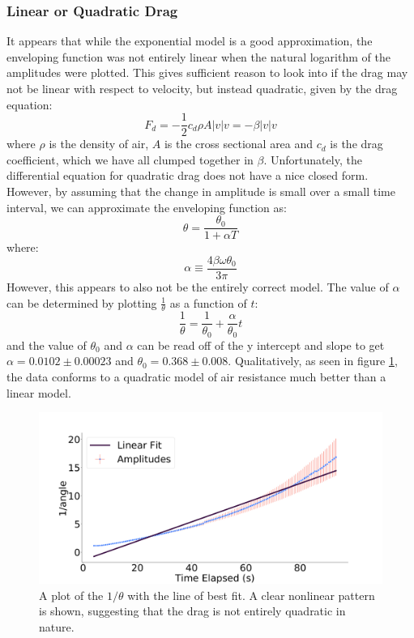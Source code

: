 \documentclass[%
 reprint,
 amsmath,amssymb
 aps,
]{revtex4-2}
\begin{document}
\subsubsection{Linear or Quadratic Drag}
It appears that while the exponential model is a good approximation, the enveloping function was not entirely linear when the natural logarithm of the amplitudes were plotted. This gives sufficient reason to look into if the drag may not be linear with respect to velocity, but instead quadratic, given by the drag equation:
\begin{equation}
    F_d = -\frac{1}{2}c_d\rho A|v|v = -\beta |v|v
    \label{eq:}
\end{equation}
where $\rho$ is the density of air, $A$ is the cross sectional area and $c_d$ is the drag coefficient, which we have all clumped together in $\beta$. Unfortunately, the differential equation for quadratic drag does not have a nice closed form. However, by assuming that the change in amplitude is small over a small time interval, we can approximate the enveloping function as\cite{Hauko}:
\begin{equation}
    \theta = \displaystyle \frac{\theta_0}{1+\alpha T}
    \label{eq:}
\end{equation}
where:
\begin{equation}
    \alpha \equiv \frac{4\beta \omega \theta_0}{3\pi}
    \label{eq:}
\end{equation}
However, this appears to also not be the entirely correct model. The value of $\alpha$ can be determined by plotting $\frac{1}{\theta}$ as a function of $t$:
\begin{equation}
    \frac{1}{\theta} = \frac{1}{\theta_0}+\frac{\alpha}{\theta_0}t
    \label{eq:}
\end{equation}
and the value of $\theta_0$ and $\alpha$ can be read off of the y intercept and slope to get $\alpha = 0.0102 \pm 0.00023$ and $\theta_0=0.368 \pm 0.008$. Qualitatively, as seen in figure \ref{fig:quad-amplitude-vs-time}, the data conforms to a quadratic model of air resistance much better than a linear model. 
\begin{figure}[h]
    \includegraphics[width=\linewidth]{figures/quadratic-amplitude-vs-time-fitted.png}

    \caption{A plot of the $1/\theta$ with the line of best fit. A clear nonlinear pattern is shown, suggesting that the drag is not entirely quadratic in nature.}
    \label{fig:quad-amplitude-vs-time}
\end{figure}
\end{document}
